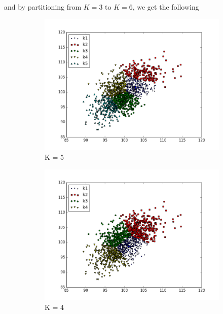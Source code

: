 \documentclass[12pt]{article}
\numberwithin{equation}{subsection}
\begin{document}
and by partitioning from $K=3$ to $K=6$, we get the following
\begin{figure}[H] 
  \begin{subfigure}[b]{0.5\linewidth}
    \centering
    \includegraphics[width=0.9\linewidth]{KCluster1} 
    \caption{K = 5} 
    \label{fig5:a} 
    \vspace{4ex}
  \end{subfigure}%
  \begin{subfigure}[b]{0.5\linewidth}
    \centering
    \includegraphics[width=0.9\linewidth]{KCluster2} 
    \caption{K = 4} 
    \label{fig5:b} 
    \vspace{4ex}
  \end{subfigure} 
  \begin{subfigure}[b]{0.5\linewidth}
    \centering

\end{subfigure}
\end{figure}
\end{document}
